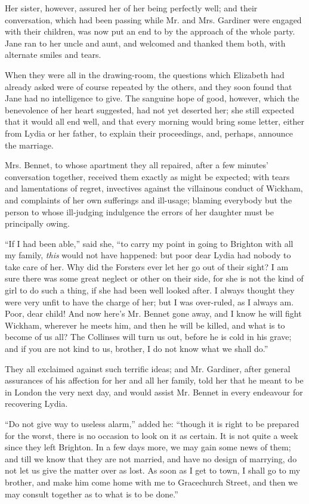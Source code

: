 \documentclass[12pt]{book}
\begin{document}
Her sister, however, assured her of her being perfectly well; and their conversation, which had been passing while Mr. and Mrs. Gardiner were engaged with their children, was now put an end to by the approach of the whole party. Jane ran to her uncle and aunt, and welcomed and thanked them both, with alternate smiles and tears.

When they were all in the drawing-room, the questions which Elizabeth had already asked were of course repeated by the others, and they soon found that Jane had no intelligence to give. The sanguine hope of good, however, which the benevolence of her heart suggested, had not yet deserted her; she still expected that it would all end well, and that every morning would bring some letter, either from Lydia or her father, to explain their proceedings, and, perhaps, announce the marriage.

Mrs. Bennet, to whose apartment they all repaired, after a few minutes' conversation together, received them exactly as might be expected; with tears and lamentations of regret, invectives against the villainous conduct of Wickham, and complaints of her own sufferings and ill-usage; blaming everybody but the person to whose ill-judging indulgence the errors of her daughter must be principally owing.

``If I had been able,'' said she, ``to carry my point in going to Brighton with all my family, \textit{this} would not have happened: but poor dear Lydia had nobody to take care of her. Why did the Forsters ever let her go out of their sight? I am sure there was some great neglect or other on their side, for she is not the kind of girl to do such a thing, if she had been well looked after. I always thought they were very unfit to have the charge of her; but I was over-ruled, as I always am. Poor, dear child! And now here's Mr. Bennet gone away, and I know he will fight Wickham, wherever he meets him, and then he will be killed, and what is to become of us all? The Collinses will turn us out, before he is cold in his grave; and if you are not kind to us, brother, I do not know what we shall do.''

They all exclaimed against such terrific ideas; and Mr. Gardiner, after general assurances of his affection for her and all her family, told her that he meant to be in London the very next day, and would assist Mr. Bennet in every endeavour for recovering Lydia.

``Do not give way to useless alarm,'' added he: ``though it is right to be prepared for the worst, there is no occasion to look on it as certain. It is not quite a week since they left Brighton. In a few days more, we may gain some news of them; and till we know that they are not married, and have no design of marrying, do not let us give the matter over as lost. As soon as I get to town, I shall go to my brother, and make him come home with me to Gracechurch Street, and then we may consult together as to what is to be done.''
\end{document}

